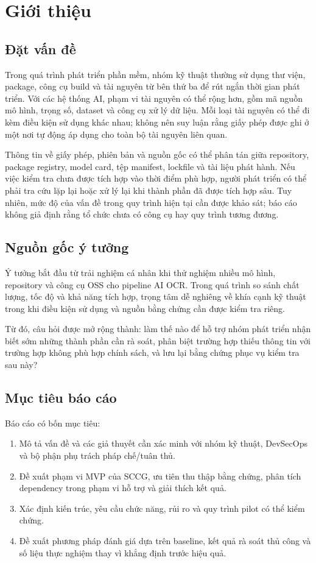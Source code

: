 \chapter{Giới thiệu}

\section{Đặt vấn đề}
Trong quá trình phát triển phần mềm, nhóm kỹ thuật thường sử dụng thư viện, package, công cụ build và tài nguyên từ bên thứ ba để rút ngắn thời gian phát triển. Với các hệ thống AI, phạm vi tài nguyên có thể rộng hơn, gồm mã nguồn mô hình, trọng số, dataset và công cụ xử lý dữ liệu. Mỗi loại tài nguyên có thể đi kèm điều kiện sử dụng khác nhau; không nên suy luận rằng giấy phép được ghi ở một nơi tự động áp dụng cho toàn bộ tài nguyên liên quan.

Thông tin về giấy phép, phiên bản và nguồn gốc có thể phân tán giữa repository, package registry, model card, tệp manifest, lockfile và tài liệu phát hành. Nếu việc kiểm tra chưa được tích hợp vào thời điểm phù hợp, người phát triển có thể phải tra cứu lặp lại hoặc xử lý lại khi thành phần đã được tích hợp sâu. Tuy nhiên, mức độ của vấn đề trong quy trình hiện tại cần được khảo sát; báo cáo không giả định rằng tổ chức chưa có công cụ hay quy trình tương đương.

\section{Nguồn gốc ý tưởng}
Ý tưởng bắt đầu từ trải nghiệm cá nhân khi thử nghiệm nhiều mô hình, repository và công cụ OSS cho pipeline AI OCR. Trong quá trình so sánh chất lượng, tốc độ và khả năng tích hợp, trọng tâm dễ nghiêng về khía cạnh kỹ thuật trong khi điều kiện sử dụng và nguồn bằng chứng cần được kiểm tra riêng.

Từ đó, câu hỏi được mở rộng thành: làm thế nào để hỗ trợ nhóm phát triển nhận biết sớm những thành phần cần rà soát, phân biệt trường hợp thiếu thông tin với trường hợp không phù hợp chính sách, và lưu lại bằng chứng phục vụ kiểm tra sau này?

\section{Mục tiêu báo cáo}
Báo cáo có bốn mục tiêu:
\begin{enumerate}[label=\arabic*.]
    \item Mô tả vấn đề và các giả thuyết cần xác minh với nhóm kỹ thuật, DevSecOps và bộ phận phụ trách pháp chế/tuân thủ.
    \item Đề xuất phạm vi MVP của SCCG, ưu tiên thu thập bằng chứng, phân tích dependency trong phạm vi hỗ trợ và giải thích kết quả.
    \item Xác định kiến trúc, yêu cầu chức năng, rủi ro và quy trình pilot có thể kiểm chứng.
    \item Đề xuất phương pháp đánh giá dựa trên baseline, kết quả rà soát thủ công và số liệu thực nghiệm thay vì khẳng định trước hiệu quả.
\end{enumerate}

